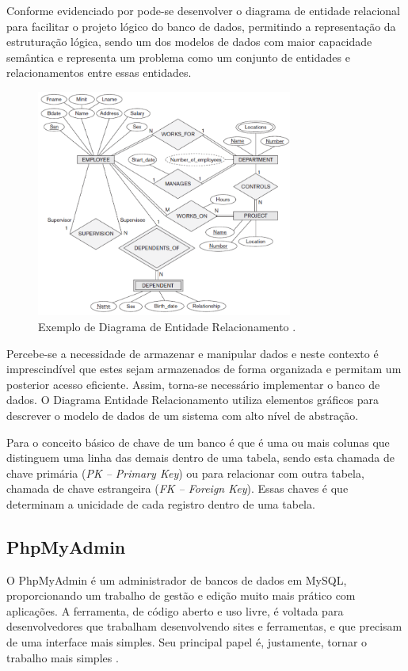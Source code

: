     Conforme evidenciado por  pode-se desenvolver o diagrama de entidade relacional para facilitar o projeto lógico do banco de dados, permitindo a representação da estruturação lógica, sendo um dos modelos de dados com maior capacidade semântica e representa um problema como um conjunto de entidades e relacionamentos entre essas entidades.
    
    \begin{figure}[h]
    \centering
    \includegraphics[width=0.75\textwidth]{./img/ExemploDiagramEntidadeRelacionamento.png}
    \caption{Exemplo de Diagrama de Entidade Relacionamento .}
    \label{fig:ExemploDiagramEntidadeRelacionamento}
    \end{figure}

    Percebe-se a necessidade de armazenar e manipular dados e neste contexto é imprescindível que estes sejam armazenados de forma organizada e permitam um posterior acesso eficiente. Assim, torna-se necessário implementar o banco de dados. O Diagrama Entidade Relacionamento utiliza elementos gráficos para descrever o modelo de dados de um sistema com alto nível de abstração.

    Para  o conceito básico de chave de um banco é que é uma ou mais colunas que distinguem uma linha das demais dentro de uma tabela, sendo esta chamada de chave primária (\textit{PK – Primary Key}) ou para relacionar com outra tabela, chamada de chave estrangeira (\textit{FK – Foreign Key}). Essas chaves é que determinam a unicidade de cada registro dentro de uma tabela.
   
 \subsection{PhpMyAdmin}
   O PhpMyAdmin é um administrador de bancos de dados em MySQL, proporcionando um trabalho de gestão e edição muito mais prático com aplicações. A ferramenta, de código aberto e uso livre, é voltada para desenvolvedores que trabalham desenvolvendo sites e ferramentas, e que precisam de uma interface mais simples. Seu principal papel é, justamente, tornar o trabalho mais simples \cite{souzaIvan}.
   
